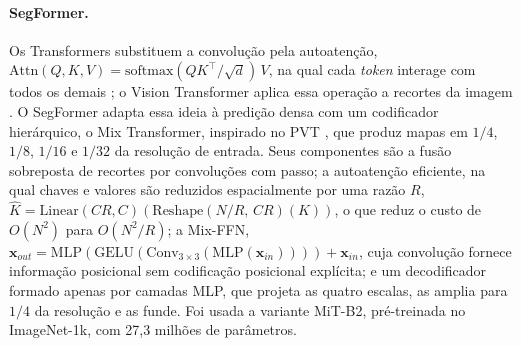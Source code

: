 \documentclass[12pt]{article}
\begin{document}
\paragraph{SegFormer.} Os Transformers substituem a convolução pela autoatenção, $\mathrm{Attn}(Q,K,V)=\mathrm{softmax}(QK^\top/\sqrt{d})\,V$, na qual cada \textit{token} interage com todos os demais \cite{vaswani2017}; o Vision Transformer aplica essa operação a recortes da imagem \cite{dosovitskiy2021vit}. O SegFormer adapta essa ideia à predição densa com um codificador hierárquico, o Mix Transformer, inspirado no PVT \cite{wang2021pvt,xie2021segformer}, que produz mapas em $1/4$, $1/8$, $1/16$ e $1/32$ da resolução de entrada. Seus componentes são a fusão sobreposta de recortes por convoluções com passo; a autoatenção eficiente, na qual chaves e valores são reduzidos espacialmente por uma razão $R$, $\hat{K}=\mathrm{Linear}(C R, C)(\mathrm{Reshape}(N/R,\,C R)(K))$, o que reduz o custo de $O(N^2)$ para $O(N^2/R)$; a Mix-FFN, $\mathbf{x}_{out}=\mathrm{MLP}(\mathrm{GELU}(\mathrm{Conv}_{3\times3}(\mathrm{MLP}(\mathbf{x}_{in}))))+\mathbf{x}_{in}$, cuja convolução fornece informação posicional sem codificação posicional explícita; e um decodificador formado apenas por camadas MLP, que projeta as quatro escalas, as amplia para $1/4$ da resolução e as funde. Foi usada a variante MiT-B2, pré-treinada no ImageNet-1k, com 27,3 milhões de parâmetros.
\end{document}
